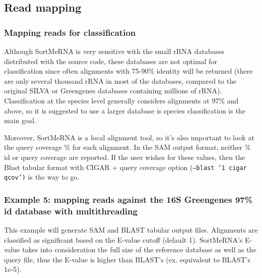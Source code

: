 \documentclass[10pt,a4paper]{article}
\begin{document}
\newpage
\subsection{Read mapping}

\subsubsection{Mapping reads for classification}

Although SortMeRNA is very sensitive with the small rRNA databases distributed with the source code,
these databases are not optimal for classification since often alignments with 75-90\% identity
will be returned (there are only several thousand rRNA in most of the databases, compared to the original
SILVA or Greengenes databases containing millions of rRNA). Classification at the species level generally
considers alignments at 97\% and above, so it is suggested to use a larger database is species classification
is the main goal.

Moreover, SortMeRNA is a local alignment tool, so it's also important to look at the query coverage \% for
each alignment. In the SAM output format, neither \% id or query coverage are reported. If the user wishes
for these values, then the Blast tabular format with CIGAR + query coverage option {(\tt--blast '1 cigar qcov')} is the way to go.

\subsubsection{Example 5: mapping reads against the 16S Greengenes 97\% id database with multithreading}

This example will generate SAM and BLAST tabular output files. Alignments are classified as significant
based on the E-value cutoff (default 1). SortMeRNA's E-value takes into consideration the full size of the
reference database as well as the query file, thus the E-value is higher than BLAST's (ex. equivalent to BLAST's 1e-5).
\end{document}

